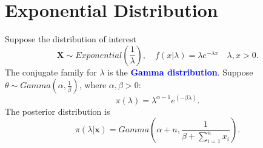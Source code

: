 \section{Exponential Distribution}
Suppose the distribution of interest
\[\mathbf{X}\sim Exponential\left( \frac{1}{\lambda} \right),\quad f\left( x|\lambda \right) =\lambda e^{-\lambda x}\quad \lambda,x>0.\]
The conjugate family for $\lambda$ is the \textcolor{Blue}{\textbf{Gamma
distribution}}. Suppose $\theta\sim Gamma\left( \alpha,\frac{1}{\beta} \right)$, where $\alpha, \beta >0$:
\[\pi \left( \lambda \right) =\lambda^{\alpha-1}e^{\left( -\beta\lambda \right) }.\]
The posterior distribution is
\[\pi \left( \lambda|\mathbf{x} \right) =Gamma\left( \alpha +n,\frac{1}{\beta +\sum_{i=1}^{n}x_{i}} \right).\]
